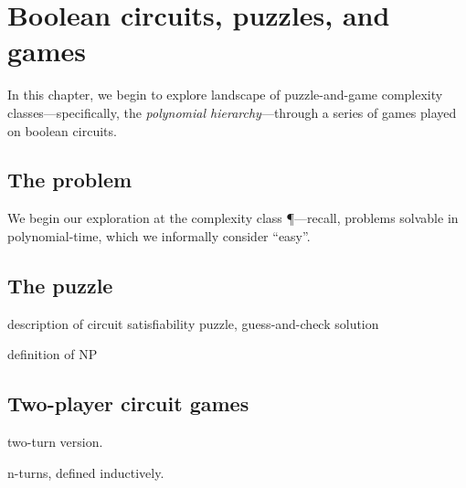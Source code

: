 \chapter{Boolean circuits, puzzles, and games}

In this chapter, we begin to explore landscape of puzzle-and-game complexity
classes---specifically, the \emph{polynomial hierarchy}---through a series of
games played on boolean circuits.

\section{The  problem}

We begin our exploration at the complexity class \P---recall, problems solvable
in polynomial-time, which we informally consider ``easy''.

\section{The  puzzle}

description of circuit satisfiability puzzle, guess-and-check solution

definition of NP

\section{Two-player circuit games}

two-turn version.


n-turns, defined inductively.
